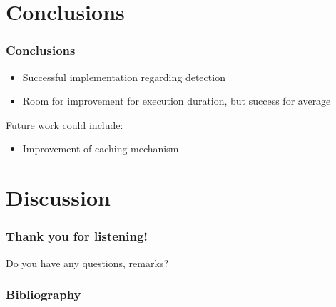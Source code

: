 \documentclass[xcolor=dvipsnames]{beamer}
\begin{document}
	\section{Conclusions}
	\begin{frame}
		\frametitle{Conclusions}
		\begin{itemize}
			\item Successful implementation regarding detection
			\item Room for improvement for execution duration, but success for average
		\end{itemize}
		\pause
		Future work could include:
		\begin{itemize}
			\item Improvement of caching mechanism
		\end{itemize}
	\end{frame}
	
	\section{Discussion}
	\begin{frame}
		\frametitle{Thank you for listening!}
		Do you have any questions, remarks?
	\end{frame}
	
	\begin{frame}[shrink=40,fragile]
		\frametitle{Bibliography}
		\vspace*{1cm}~\\
		
		
	\end{frame}
\end{document}
